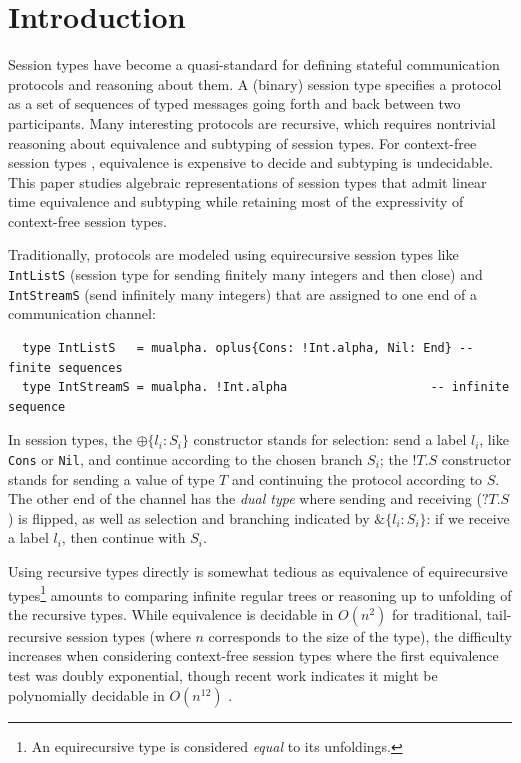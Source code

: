\section{Introduction}
\label{sec:introduction}

Session types
\cite{DBLP:conf/concur/Honda93,DBLP:conf/parle/TakeuchiHK94,DBLP:conf/esop/HondaVK98}
have become a quasi-standard for defining stateful communication
protocols and reasoning about them. A (binary) session
type specifies a protocol as a set of sequences of typed messages going forth
and back between two participants. Many interesting protocols are
recursive, which requires nontrivial reasoning about equivalence and
subtyping of session types. For context-free session types
\cite{DBLP:conf/icfp/ThiemannV16}, equivalence is expensive to decide
and subtyping is undecidable. This paper studies algebraic representations of session types that
admit linear time equivalence and subtyping while retaining most of the
expressivity of context-free session types.

Traditionally, protocols are modeled using equirecursive session
types like \lstinline{IntListS} (session type for sending finitely many integers and then
close) and \lstinline{IntStreamS} (send infinitely many integers) that
are assigned to one end of a communication channel:
\begin{lstlisting}
  type IntListS   = mualpha. oplus{Cons: !Int.alpha, Nil: End} -- finite sequences
  type IntStreamS = mualpha. !Int.alpha                    -- infinite sequence
\end{lstlisting}
In session types, the $\oplus\{l_i:S_i\}$ constructor stands for
selection: send a label $l_i$, like
\lstinline|Cons| or \lstinline|Nil|, and continue according to the
chosen branch $S_i$; the $!T.S$ constructor stands for sending a value of
type $T$ and continuing the protocol according to $S$. The other end
of the channel has the \emph{dual type} where sending and receiving ($?T.S$)
is flipped, as well as selection and branching indicated by
$\&\{l_i:S_i\}$: if we receive a label $l_i$, then continue with $S_i$.

Using recursive types directly is somewhat tedious as equivalence of
equirecursive types\footnote{An equirecursive type is considered
  \emph{equal} to its unfoldings.} amounts to comparing infinite regular trees or
reasoning up to unfolding of the recursive types. While equivalence is
decidable in $O(n^2)$ for traditional, tail-recursive session types
(where $n$ corresponds to the size of the type), 
the difficulty increases when considering context-free session types
\cite{DBLP:conf/icfp/ThiemannV16,DBLP:conf/esop/Padovani17,DBLP:journals/toplas/Padovani19,DBLP:journals/corr/abs-2106-06658,
  DBLP:conf/esop/DasDMP21} where the first equivalence test was doubly
exponential\cite{DBLP:conf/tacas/AlmeidaMV20}, though recent work
indicates it might be polynomially decidable in
$O(n^{12})$ \cite{DBLP:journals/corr/abs-2407-04063}.

